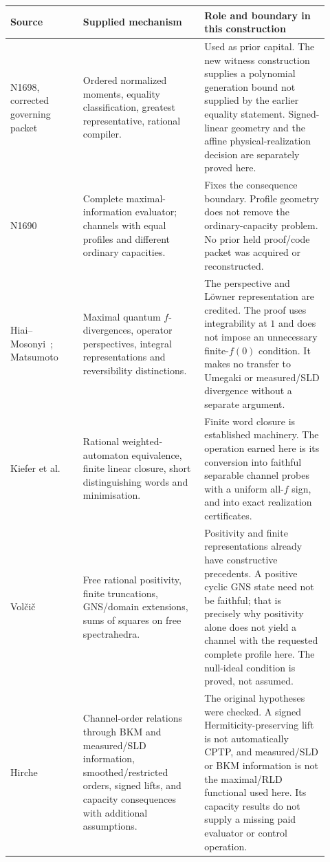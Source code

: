 \documentclass[11pt,a4paper]{article}
\theoremstyle{definition}\newtheorem{definition}[theorem]{Definition}
\begin{document}
\begin{longtable}{p{0.21\linewidth}p{0.35\linewidth}p{0.36\linewidth}}
\toprule
Source & Supplied mechanism & Role and boundary in this construction\\
\midrule
\endhead
N1698, corrected governing packet~\cite{N1698} & Ordered normalized moments, equality classification, greatest representative, rational compiler. & Used as prior capital. The new witness construction supplies a polynomial generation bound not supplied by the earlier equality statement. Signed-linear geometry and the affine physical-realization decision are separately proved here.\\
\addlinespace
N1690~\cite{N1690} & Complete maximal-information evaluator; channels with equal profiles and different ordinary capacities. & Fixes the consequence boundary. Profile geometry does not remove the ordinary-capacity problem. No prior held proof/code packet was acquired or reconstructed.\\
\addlinespace
Hiai--Mosonyi~\cite{HiaiMosonyi}; Matsumoto~\cite{Matsumoto} & Maximal quantum $f$-divergences, operator perspectives, integral representations and reversibility distinctions. & The perspective and L\"owner representation are credited. The proof uses integrability at $1$ and does not impose an unnecessary finite-$f(0)$ condition. It makes no transfer to Umegaki or measured/SLD divergence without a separate argument.\\
\addlinespace
Kiefer et al.~\cite{Kiefer} & Rational weighted-automaton equivalence, finite linear closure, short distinguishing words and minimisation. & Finite word closure is established machinery. The operation earned here is its conversion into faithful separable channel probes with a uniform all-$f$ sign, and into exact realization certificates.\\
\addlinespace
Vol\v{c}i\v{c}~\cite{Volcic} & Free rational positivity, finite truncations, GNS/domain extensions, sums of squares on free spectrahedra. & Positivity and finite representations already have constructive precedents. A positive cyclic GNS state need not be faithful; that is precisely why positivity alone does not yield a channel with the requested complete profile here. The null-ideal condition is proved, not assumed.\\
\addlinespace
Hirche~\cite{Hirche} & Channel-order relations through BKM and measured/SLD information, smoothed/restricted orders, signed lifts, and capacity consequences with additional assumptions. & The original hypotheses were checked. A signed Hermiticity-preserving lift is not automatically CPTP, and measured/SLD or BKM information is not the maximal/RLD functional used here. Its capacity results do not supply a missing paid evaluator or control operation.\\
\bottomrule
\end{longtable}
\end{document}

